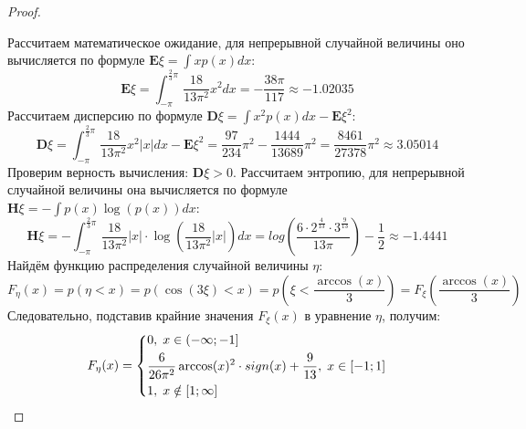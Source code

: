 \begin{proof}
\begin{center}
	\end{center}
	Рассчитаем математическое ожидание, для непрерывной случайной величины оно вычисляется по формуле $\textbf{E}\xi = \int x p(x) dx$:
	\[
		\textbf{E}\xi = \int_{-\pi}^{\frac{2}{3}\pi} \frac{18}{13\pi^2} x^2 dx = -\frac{38\pi}{117} \approx -1.02035
	\]
	Рассчитаем дисперсию по формуле $\textbf{D}\xi = \int x^2 p(x) dx - {\textbf{E}\xi}^2$:
	\[
		\textbf{D}\xi = \int_{-\pi}^{\frac{2}{3}\pi} \frac{18}{13\pi^2} x^2 |x| dx - {\textbf{E}\xi}^2 = \frac{97}{234} \pi^2 - \frac{1444}{13689} \pi^2 = \frac{8461}{27378} \pi^2 \approx 3.05014
	\]
	Проверим верность вычисления: $\textbf{D}\xi > 0$.
	Рассчитаем энтропию, для непрерывной случайной величины она вычисляется по формуле $\textbf{H}\xi = -\int p(x) \log(p(x)) dx$:
	\[
		\textbf{H}\xi = -\int_{-\pi}^{\frac{2}{3}\pi} \frac{18}{13\pi^2} |x| \cdot \log(\frac{18}{13\pi^2} |x|) dx = log(\frac{6 \cdot 2^{\frac{4}{13}} \cdot 3^{\frac{9}{13}}}{13\pi}) - \frac{1}{2} \approx -1.4441
	\]
	Найдём функцию распределения случайной величины $\eta$:
	\[
		F_\eta(x) = p(\eta < x) = p(\cos(3\xi) < x) = p(\xi < \frac{\arccos(x)}{3}) = F_\xi(\frac{\arccos(x)}{3})
	\]
	Следовательно, подставив крайние значения $F_\xi(x)$ в уравнение $\eta$, получим:
	\[F_\eta(x) =
	\begin{dcases}
	0, \; x \in (-\infty;-1]\\
	\frac{6}{26\pi^2} \arccos(x)^2 \cdot sign(x) + \frac{9}{13}, \; x \in [-1;1]\\
	1, \; x \notin [1;\infty]
	\end{dcases}
	\]
\end{proof}